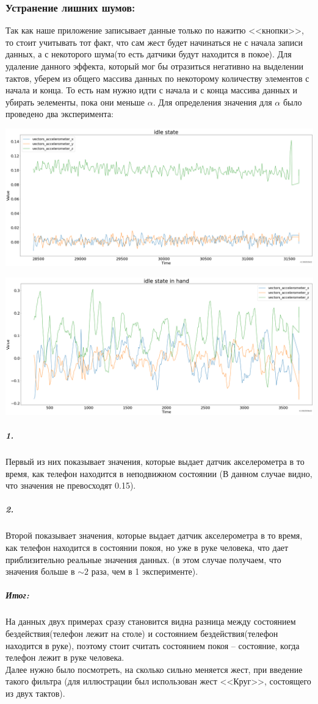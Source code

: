 \documentclass[a4paper]{article}
\begin{document}
\subsubsection*{Устранение лишних шумов:}
Так как наше приложение записывает данные только по нажитю <<кнопки>>, то стоит учитывать тот факт, что сам жест будет начинаться не с начала записи данных, а с некоторого шума(то есть датчики будут находится в покое). Для удаление данного эффекта, который мог бы отразиться негативно на выделении тактов, уберем из общего массива данных по некоторому количеству элементов с начала и конца. То есть нам нужно идти с начала и с конца массива данных и убирать эелементы, пока они меньше $\alpha$. Для определения значения для $\alpha$ было проведено два эксперимента:

\includegraphics[scale = 0.17]{idle_state.png}

\includegraphics[scale = 0.17]{idle_state_in_hand.png}

\subparagraph{1.} Первый из них показывает значения, которые выдает датчик акселерометра в то время, как телефон находится в неподвижном состоянии (В данном случае видно, что значения не превосходят 0.15).
\subparagraph{2.} Второй показывает значения, которые выдает датчик акселерометра в то время, как телефон находится в состоянии покоя, но уже в руке человека, что дает приблизительно реальные значения данных. (в этом случае получаем, что значения больше в $\sim 2$ раза, чем в 1 эксперименте).
\subparagraph{Итог:}
На данных двух примерах сразу становится видна разница между состоянием бездействия(телефон лежит на столе) и состоянием бездействия(телефон находится в руке), поэтому стоит считать состоянием покоя -- состояние, когда телефон лежит в руке человека. \\
Далее нужно было посмотреть, на сколько сильно меняется жест, при введение такого фильтра (для иллюстрации был использован жест <<Круг>>, состоящего из двух тактов).
\end{document}
